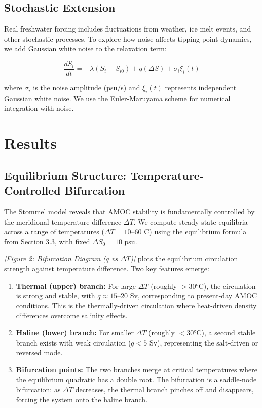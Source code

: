 \documentclass[12pt,letterpaper]{article}
\begin{document}
\subsection{Stochastic Extension}

Real freshwater forcing includes fluctuations from weather, ice melt events, and other stochastic processes. To explore how noise affects tipping point dynamics, we add Gaussian white noise to the relaxation term:

\begin{equation}
\frac{dS_i}{dt} = -\lambda(S_i - S_{i0}) + q(\Delta S) + \sigma_i \xi_i(t)
\end{equation}

where $\sigma_i$ is the noise amplitude (psu/s) and $\xi_i(t)$ represents independent Gaussian white noise. We use the Euler-Maruyama scheme for numerical integration with noise.

\section{Results}

\subsection{Equilibrium Structure: Temperature-Controlled Bifurcation}

The Stommel model reveals that AMOC stability is fundamentally controlled by the meridional temperature difference $\Delta T$. We compute steady-state equilibria across a range of temperatures ($\Delta T = 10$--60$^\circ$C) using the equilibrium formula from Section 3.3, with fixed $\Delta S_0 = 10$ psu.

\textit{[Figure 2: Bifurcation Diagram ($q$ vs $\Delta T$)]} plots the equilibrium circulation strength against temperature difference. Two key features emerge:

\begin{enumerate}

\item \textbf{Thermal (upper) branch:} For large $\Delta T$ (roughly $> 30$°C), the circulation is strong and stable, with $q \approx 15$--20 Sv, corresponding to present-day AMOC conditions. This is the thermally-driven circulation where heat-driven density differences overcome salinity effects.

\item \textbf{Haline (lower) branch:} For smaller $\Delta T$ (roughly $< 30$°C), a second stable branch exists with weak circulation ($q < 5$ Sv), representing the salt-driven or reversed mode.

\item \textbf{Bifurcation points:} The two branches merge at critical temperatures where the equilibrium quadratic has a double root. The bifurcation is a saddle-node bifurcation: as $\Delta T$ decreases, the thermal branch pinches off and disappears, forcing the system onto the haline branch.

\end{enumerate}
\end{document}
